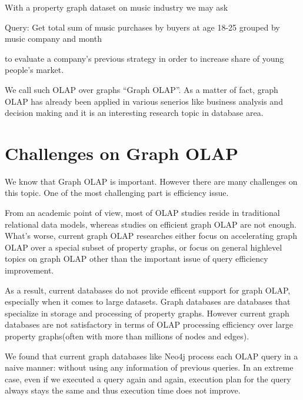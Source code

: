 With a property graph dataset on music industry we may ask

Query: 		Get total sum of music purchases by buyers at age 18-25 grouped by music company and month

to evaluate a company's previous strategy in order to increase share of young people's market.

We call such OLAP over graphs ``Graph OLAP''. As a matter of fact, graph OLAP has already been applied in various senerios like business analysis and decision making and it is an interesting research topic in database area.



\section{Challenges on Graph OLAP}

We know that Graph OLAP is important. However there are many challenges on this topic. One of the most challenging part is efficiency issue. 

From an academic point of view, most of OLAP studies reside in traditional relational data models, whereas studies on efficient graph OLAP are not enough. What's worse, current graph OLAP researches either focus on accelerating graph OLAP over a special subset of property graphs, or focus on general highlevel topics on graph OLAP other than the important issue of query efficiency improvement. 

As a result, current databases do not provide efficent support for graph OLAP, especially when it comes to large datasets. Graph databases are databases that specialize in storage and processing of property graphs. However current graph databases are not satisfactory in terms of OLAP processing efficiency over large property graphs(often with more than millions of nodes and edges). 

	We found that current graph databases like Neo4j process each OLAP query in a naive manner: without using any information of previous queries. In an extreme case, even if we executed a query again and again, execution plan for the query always stays the same and thus execution time does not improve. 

